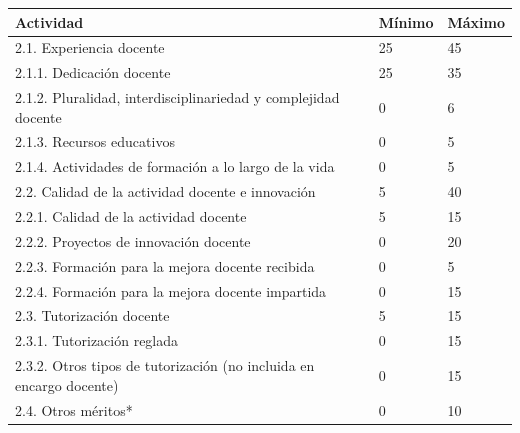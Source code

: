 \documentclass{article}
\begin{document}
\begin{itemize}
\begin{itemize}
\begin{scriptsize}
                  \vspace{0.4cm}
                  \begin{table}[h!]\centering\renewcommand{\arraystretch}{1.3}
                    \begin{tabular}{|p{}|p{}|p{}|}\hline
                      Actividad                                                           & Mínimo & Máximo \\\hline
                      2.1. Experiencia docente                                            & 25     & 45     \\\hline
                      2.1.1. Dedicación docente                                           & 25     & 35     \\\hline
                      2.1.2. Pluralidad, interdisciplinariedad y complejidad docente      & 0      & 6      \\\hline
                      2.1.3. Recursos educativos                                          & 0      & 5      \\\hline
                      2.1.4. Actividades de formación a lo largo de la vida               & 0      & 5      \\\hline
                      2.2. Calidad de la actividad docente e innovación                   & 5      & 40     \\\hline
                      2.2.1. Calidad de la actividad docente                              & 5      & 15     \\\hline
                      2.2.2. Proyectos de innovación docente                              & 0      & 20     \\\hline
                      2.2.3. Formación para la mejora docente recibida                    & 0      & 5      \\\hline
                      2.2.4. Formación para la mejora docente impartida                   & 0      & 15     \\\hline
                      2.3. Tutorización docente                                           & 5      & 15     \\\hline
                      2.3.1. Tutorización reglada                                         & 0      & 15     \\\hline
                      2.3.2. Otros tipos de tutorización (no incluida en encargo docente) & 0      & 15     \\\hline
                      2.4. Otros méritos*                                                 & 0      & 10     \\\hline
                    \end{tabular}\end{table}
                  \vspace{0.4cm}


\end{scriptsize}
\end{itemize}
\end{itemize}
\end{document}
